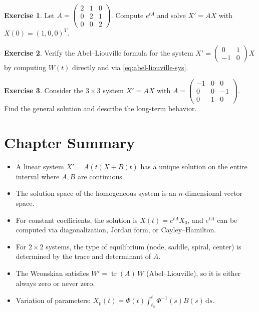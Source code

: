 \documentclass[12pt,a4paper,openany]{book}
\theoremstyle{definition}
\newtheorem{exercise}{Exercise}[chapter]
\theoremstyle{plain}
\theoremstyle{remark}
\newcommand{\dd}{\mathrm{d}}
\DeclareMathOperator{\tr}{tr}
\begin{document}
\begin{exercise}\label{exo:sys-6}
Let $A=\begin{pmatrix}2&1&0\\0&2&1\\0&0&2\end{pmatrix}$.
Compute $e^{tA}$ and solve $X'=AX$ with $X(0)=(1,0,0)^T$.
\end{exercise}

\begin{exercise}\label{exo:sys-7}
Verify the Abel--Liouville formula for the system
$X'=\begin{pmatrix}0&1\\-1&0\end{pmatrix}X$
by computing $W(t)$ directly and via \eqref{eq:abel-liouville-sys}.
\end{exercise}

\begin{exercise}\label{exo:sys-8}
Consider the $3\times 3$ system $X'=AX$ with
$A=\begin{pmatrix}-1&0&0\\0&0&-1\\0&1&0\end{pmatrix}$.
Find the general solution and describe the long-term behavior.
\end{exercise}

\section{Chapter Summary}\label{sec:sys-summary}

\begin{itemize}
  \item A linear system $X'=A(t)X+B(t)$ has a unique solution on the
    entire interval where $A,B$ are continuous.
  \item The solution space of the homogeneous system is an $n$-dimensional
    vector space.
  \item For constant coefficients, the solution is $X(t)=e^{tA}X_0$, and
    $e^{tA}$ can be computed via diagonalization, Jordan form, or
    Cayley--Hamilton.
  \item For $2\times 2$ systems, the type of equilibrium (node, saddle,
    spiral, center) is determined by the trace and determinant of $A$.
  \item The Wronskian satisfies $W'=\tr(A)\,W$ (Abel--Liouville), so it
    is either always zero or never zero.
  \item Variation of parameters:
    $X_p(t)=\Phi(t)\int_{t_0}^t\Phi^{-1}(s)B(s)\,\dd s$.
\end{itemize}
\end{document}
